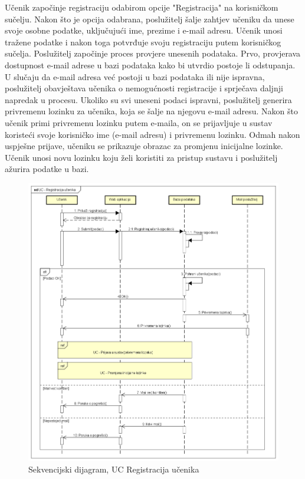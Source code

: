 Učenik započinje registraciju odabirom opcije "Registracija" na korisničkom sučelju. Nakon što je opcija odabrana, poslužitelj šalje zahtjev učeniku da unese svoje osobne podatke, uključujući ime, prezime i e-mail adresu. Učenik unosi tražene podatke i nakon toga potvrđuje svoju registraciju putem korisničkog sučelja. Poslužitelj započinje proces provjere unesenih podataka. Prvo, provjerava dostupnost e-mail adrese u bazi podataka kako bi utvrdio postoje li odstupanja. U slučaju da e-mail adresa već postoji u bazi podataka ili nije ispravna, poslužitelj obavještava učenika o nemogućnosti registracije i sprječava daljnji napredak u procesu. Ukoliko su svi uneseni podaci ispravni, poslužitelj generira privremenu lozinku za učenika, koja se šalje na njegovu e-mail adresu. Nakon što učenik primi privremenu lozinku putem e-maila, on se prijavljuje u sustav koristeći svoje korisničko ime (e-mail adresu) i privremenu lozinku. Odmah nakon uspješne prijave, učeniku se prikazuje obrazac za promjenu inicijalne lozinke. Učenik unosi novu lozinku koju želi koristiti za pristup sustavu i poslužitelj ažurira podatke u bazi.

\begin{figure}[htp]
	\includegraphics[scale=0.45]{dijagrami/UC - Registracija ucenika.png} 
	\centering
	\caption{Sekvencijski dijagram, UC Registracija učenika}
	\label{fig:uc-registracija}
\end{figure}

